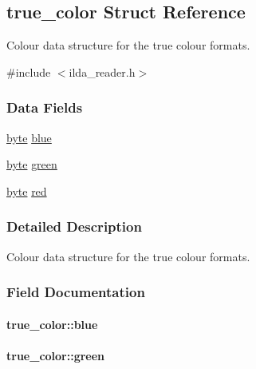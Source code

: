 \hypertarget{structtrue__color}{}\subsection{true\+\_\+color Struct Reference}
\label{structtrue__color}


Colour data structure for the true colour formats.  




{\ttfamily \#include $<$ilda\+\_\+reader.\+h$>$}

\subsubsection*{Data Fields}
\begin{DoxyCompactItemize}
\item 
\hyperlink{ilda__reader_8h_a0c8186d9b9b7880309c27230bbb5e69d}{byte} \hyperlink{structtrue__color_a10495bcfef39ca3c51caac12dd6e3478}{blue}
\item 
\hyperlink{ilda__reader_8h_a0c8186d9b9b7880309c27230bbb5e69d}{byte} \hyperlink{structtrue__color_aab9c7be436a3fa58b597718cfe071d16}{green}
\item 
\hyperlink{ilda__reader_8h_a0c8186d9b9b7880309c27230bbb5e69d}{byte} \hyperlink{structtrue__color_a8840e16b209c4cfaf42737d2ee98d8a0}{red}
\end{DoxyCompactItemize}


\subsubsection{Detailed Description}
Colour data structure for the true colour formats. 

\subsubsection{Field Documentation}
\paragraph[{\texorpdfstring{blue}{blue}}]{ true\+\_\+color\+::blue}\hypertarget{structtrue__color_a10495bcfef39ca3c51caac12dd6e3478}{}\label{structtrue__color_a10495bcfef39ca3c51caac12dd6e3478}
\paragraph[{\texorpdfstring{green}{green}}]{ true\+\_\+color\+::green}\hypertarget{structtrue__color_aab9c7be436a3fa58b597718cfe071d16}{}\label{structtrue__color_aab9c7be436a3fa58b597718cfe071d16}
